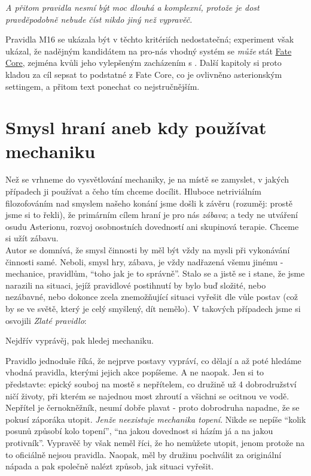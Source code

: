\documentclass[../main.tex]{subfiles}
\begin{document}
\textit{A přitom pravidla nesmí být moc dlouhá a komplexní, protože je dost pravděpodobně nebude číst nikdo jiný než vypravěč.}

Pravidla M16 se ukázala být v těchto kritériích nedostatečná; experiment však ukázal, že nadějným kandidátem na pro-nás vhodný systém se \textit{může} stát \href{https://fate.nepocitacovehry.cz/?do=StahniFC}{Fate Core}, zejména kvůli jeho vylepšeným zacházením s .  Další kapitoly si proto kladou za cíl sepsat to podstatné z Fate Core, co je ovlivněno asterionským settingem, a přitom text ponechat co nejstručnějším. 

\section{Smysl hraní aneb kdy používat mechaniku}
\label{sec:proc}

Než se vrhneme do vysvětlování mechaniky, je na místě se zamyslet, v jakých případech ji používat a čeho tím chceme docílit. Hluboce netriviálním filozofováním nad smyslem našeho konání jsme došli k závěru (rozuměj: prostě jsme si to řekli), že primárním cílem hraní je pro nás \emph{zábava}; a tedy ne utváření osudu Asterionu, rozvoj osobnostních dovedností ani skupinová terapie. Chceme si užít zábavu.\\

Autor se domnívá, že smysl činnosti by měl být vždy na mysli při vykonávání činnosti samé. Neboli, smysl hry, zábava, je vždy nadřazená všemu jinému - mechanice, pravidlům, ``toho jak je to správně''. Stalo se a jistě se i stane, že jsme narazili na situaci, jejíž pravidlové postihnutí by bylo buď složité, nebo nezábavné, nebo dokonce zcela znemožňující situaci vyřešit dle vůle postav (což by se ve světě, který je celý smyšlený, dít nemělo). V takových případech jsme si osvojili \emph{Zlaté pravidlo}:

\begin{Pravidlo}
  \centering
  Nejdřív vyprávěj, pak hledej mechaniku.
\end{Pravidlo}



Pravidlo jednoduše říká, že nejprve postavy vypráví, co dělají a až poté hledáme vhodná pravidla, kterými jejich akce popíšeme. A ne naopak. Jen si to představte: epický souboj na mostě s nepřítelem, co družině už 4 dobrodružství ničí životy, při kterém se najednou most zhroutí a všichni se ocitnou ve vodě. Nepřítel je černokněžník, neumí dobře plavat - proto dobrodruha napadne, že se pokusí záporáka utopit. \emph{Jenže neexistuje mechanika topení}. Nikde se nepíše ``kolik posunů způsobí kolo topení'', ``na jakou dovednost si házím já a na jakou protivník''. Vypravěč by však neměl říci, že ho nemůžete utopit, jenom protože na to oficiálně nejsou pravidla. Naopak, měl by družinu pochválit za originální nápada a pak společně nalézt způsob, jak situaci vyřešit.\\
\end{document}
